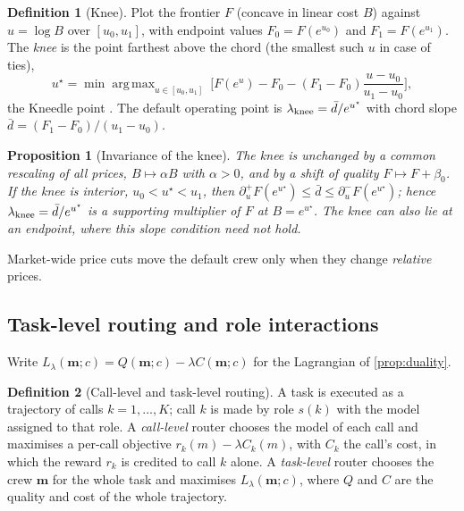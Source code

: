 \documentclass[11pt,a4paper]{article}
\newtheorem{proposition}{Proposition}
\theoremstyle{definition}
\newtheorem{definition}{Definition}
\theoremstyle{remark}
\theoremstyle{definition}
\newcommand{\crew}{\mathbf{m}}
\DeclareMathOperator*{\argmax}{arg\,max}
\begin{document}
\begin{definition}[Knee]
Plot the frontier $F$ (concave in linear cost $B$) against $u=\log B$ over $[u_0,u_1]$, with endpoint values $F_0=F(e^{u_0})$ and $F_1=F(e^{u_1})$. The \emph{knee} is the point farthest above the chord (the smallest such $u$ in case of ties),
\begin{equation}
u^\star=\min\argmax_{u\in[u_0,u_1]}\ \Big[F(e^u)-F_0-(F_1-F_0)\frac{u-u_0}{u_1-u_0}\Big],
\label{eq:knee}
\end{equation}
the Kneedle point \cite{satopaa2011}. The default operating point is $\lambda_{\rm knee}=\bar d/e^{u^\star}$ with chord slope $\bar d=(F_1-F_0)/(u_1-u_0)$.
\end{definition}

\begin{proposition}[Invariance of the knee]
\label{prop:knee}
The knee is unchanged by a common rescaling of all prices, $B\mapsto\alpha B$ with $\alpha>0$, and by a shift of quality $F\mapsto F+\beta_0$. If the knee is interior, $u_0<u^\star<u_1$, then $\partial_u^+F(e^{u^\star})\le\bar d\le\partial_u^-F(e^{u^\star})$; hence $\lambda_{\rm knee}=\bar d/e^{u^\star}$ is a supporting multiplier of $F$ at $B=e^{u^\star}$. The knee can also lie at an endpoint, where this slope condition need not hold.
\end{proposition}
Market-wide price cuts move the default crew only when they change \emph{relative} prices.

\subsection{Task-level routing and role interactions}
\label{sec:levels}

Write $L_\lambda(\crew;c)=Q(\crew;c)-\lambda C(\crew;c)$ for the Lagrangian of \cref{prop:duality}.

\begin{definition}[Call-level and task-level routing]
\label{def:levels}
A task is executed as a trajectory of calls $k=1,\dots,K$; call $k$ is made by role $s(k)$ with the model assigned to that role. A \emph{call-level} router chooses the model of each call and maximises a per-call objective $r_k(m)-\lambda C_k(m)$, with $C_k$ the call's cost, in which the reward $r_k$ is credited to call $k$ alone. A \emph{task-level} router chooses the crew $\crew$ for the whole task and maximises $L_\lambda(\crew;c)$, where $Q$ and $C$ are the quality and cost of the whole trajectory.
\end{definition}
\end{document}
